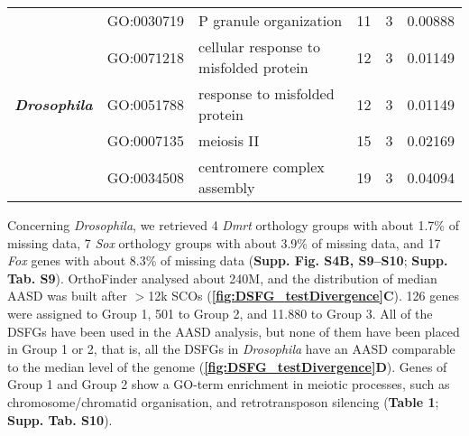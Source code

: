 \documentclass[../main.tex]{subfiles}
\begin{document}
\begin{landscape}
\begin{longtable}{@{}lllccr@{}}
     \multirow{5}{*}{\textit{\textbf{Drosophila}}} & GO:0030719 & P granule organization & 11 & 3 & 0.00888 \\
     & GO:0071218 & cellular response to misfolded protein & 12 & 3 & 0.01149 \\
     & GO:0051788 & response to misfolded protein & 12 & 3 & 0.01149 \\
     & GO:0007135 & meiosis II & 15 & 3 & 0.02169 \\
     & GO:0034508 & centromere complex assembly & 19 & 3 & 0.04094 \\* \bottomrule \bottomrule
    \end{longtable}
    \end{landscape}

Concerning \textit{Drosophila}, we retrieved 4 \textit{Dmrt} orthology groups with about 1.7\% of missing data, 7 \textit{Sox} orthology groups with about 3.9\% of missing data, and 17 \textit{Fox} genes with about 8.3\% of missing data (\textbf{Supp. Fig. S4B, S9--S10}; \textbf{Supp. Tab. S9}). OrthoFinder analysed about 240M, and the distribution of median AASD was built after $>$12k SCOs (\textbf{\ref{fig:DSFG_testDivergence}C}). 126 genes were assigned to Group 1, 501 to Group 2, and 11.880 to Group 3. All of the DSFGs have been used in the AASD analysis, but none of them have been placed in Group 1 or 2, that is, all the DSFGs in \textit{Drosophila} have an AASD comparable to the median level of the genome (\textbf{\ref{fig:DSFG_testDivergence}D}). Genes of Group 1 and Group 2 show a GO-term enrichment in meiotic processes, such as chromosome/chromatid organisation, and retrotransposon silencing (\textbf{Table 1}; \textbf{Supp. Tab. S10}).
\end{document}
